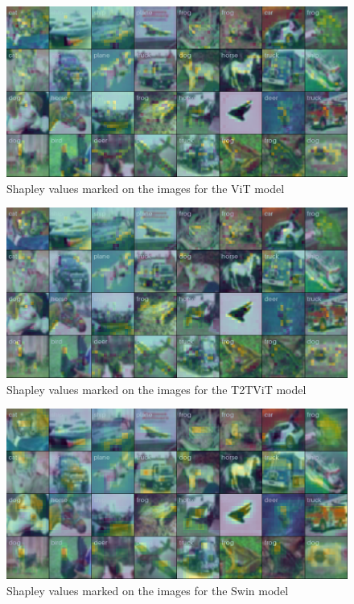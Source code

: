 \documentclass[magisterska,en]{pracamgr}
\begin{document}
\begin{figure}[H]
\centering
\includegraphics[scale=0.5]{./images/vit_shap_grid_196.png}
\caption{Shapley values marked on the images for the ViT model}
\label{vit_shap_grid_196}
\end{figure}


\begin{figure}[H]
\centering
\includegraphics[scale=0.5]{./images/t2t_vit_shap_grid_196.png}
\caption{Shapley values marked on the images for the T2T\textunderscore  ViT model}
\label{t2t_vit_shap_grid_196}
\end{figure}


\begin{figure}[H]
\centering
\includegraphics[scale=0.5]{./images/swin_shap_grid_196.png}
\caption{Shapley values marked on the images for the Swin model}
\label{swin_shap_grid_196}
\end{figure}
\end{document}
